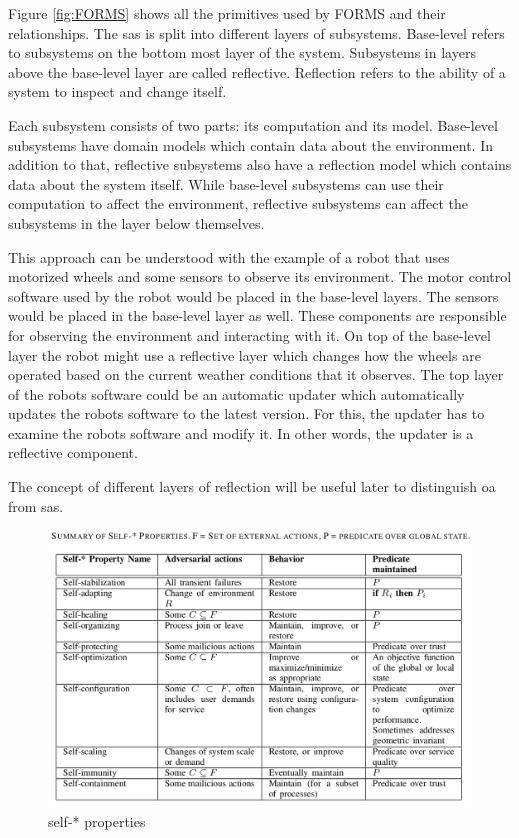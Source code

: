 \noindent Figure \ref{fig:FORMS} shows all the primitives used by FORMS and their relationships.
The \acrshort{sas} is split into different layers of subsystems.
Base-level refers to subsystems on the bottom most layer of the system.
Subsystems in layers above the base-level layer are called reflective.
Reflection refers to the ability of a system to inspect and change itself.

\noindent Each subsystem consists of two parts: its computation and its model.
Base-level subsystems have domain models which contain data about the environment.
In addition to that, reflective subsystems also have a reflection model which contains data about the system itself.
While base-level subsystems can use their computation to affect the environment,
reflective subsystems can affect the subsystems in the layer below themselves.

\noindent This approach can be understood with the example of a robot that uses motorized wheels
and some sensors to observe its environment.
The motor control software used by the robot would be placed in the base-level layers.
The sensors would be placed in the base-level layer as well.
These components are responsible for observing the environment and interacting with it.
On top of the base-level layer the robot might use a reflective layer which changes how the wheels are operated
based on the current weather conditions that it observes.
The top layer of the robots software could be an automatic updater 
which automatically updates the robots software to the latest version.
For this, the updater has to examine the robots software and modify it.
In other words, the updater is a reflective component.

\noindent The concept of different layers of reflection will be useful later to distinguish
\acrshort{oa} from \acrshort{sas}.

\begin{figure}[t!]
    \includegraphics[width=\textwidth]{images/SelfProperties.png}
    \caption{self-* properties \cite*{DissectingSelfProperties}}
    \label{fig:SelfProperties}
\end{figure}

